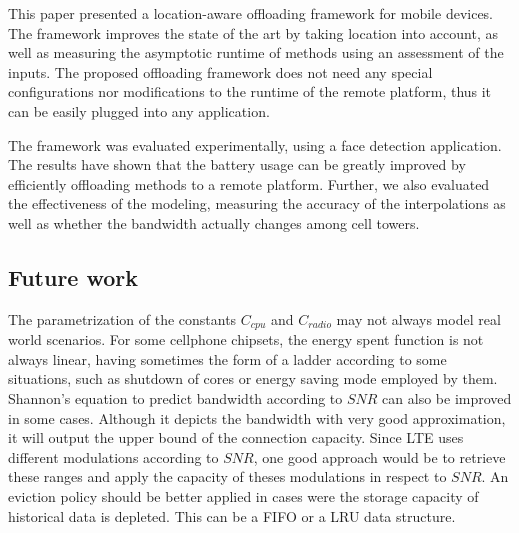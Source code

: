 \documentclass[10pt, conference, letterpaper]{IEEEtran}
\begin{document}
This paper presented a location-aware offloading framework for mobile devices. The framework improves the state of the art by taking location into account, as well as measuring the asymptotic runtime of methods using an assessment of the inputs. The proposed offloading framework does not need any special configurations nor modifications to the runtime of the remote platform, thus it can be easily plugged into any application. 

The framework was evaluated experimentally, using a face detection application. The results have shown that the battery usage can be greatly improved by efficiently offloading methods to a remote platform. Further, we also evaluated the effectiveness of the modeling, measuring the accuracy of the interpolations as well as whether the bandwidth actually changes among cell towers.

\subsection{Future work}
  The parametrization of the constants $C_{cpu}$ and $C_{radio}$ may not always model real world scenarios. For some cellphone chipsets, the energy spent function is not always linear, having sometimes the form of a ladder according to some situations, such as shutdown of cores or energy saving mode employed by them. Shannon's equation to predict bandwidth according to $SNR$ can also be improved in some cases. Although it depicts the bandwidth with very good approximation, it will output the upper bound of the connection capacity. Since LTE uses different modulations according to $SNR$, one good approach would be to retrieve these ranges and apply the capacity of theses modulations in respect to $SNR$. An eviction policy should be better applied in cases were the storage capacity of historical data is depleted. This can be a FIFO or a LRU data structure.



\end{document}
